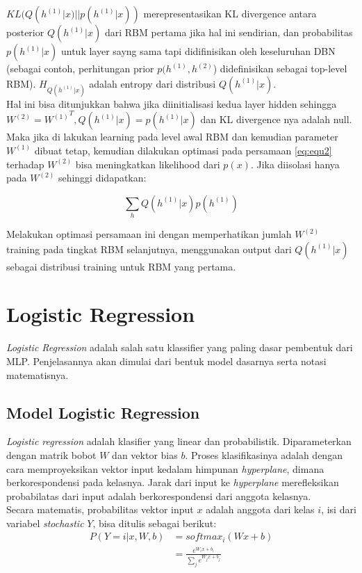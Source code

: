 $KL(Q(h^{(1)}|x) || p(h^{(1)}|x))$ merepresentasikan KL divergence antara posterior $Q(h^{(1)}|x)$ dari RBM pertama jika hal ini sendirian, dan probabilitas $p(h^{(1)}|x)$ untuk layer sayng sama tapi didifinisikan oleh keseluruhan DBN (sebagai contoh, perhitungan prior $p(h^{(1)},h^{(2)}$) didefinisikan sebagai top-level RBM). $H_{Q(h^{(1)}|x)}$ adalah entropy dari distribusi $Q(h^{(1)}|x)$.\\
Hal ini bisa ditunjukkan bahwa jika diinitialisasi kedua layer hidden sehingga $W^{(2)}={W^{(1)}}^T, Q(h^{(1)}|x)=p(h^{(1)}|x)$ dan KL divergence nya adalah null. Maka jika di lakukan learning pada level awal RBM dan kemudian parameter $ W^{(1)}$ dibuat tetap, kemudian dilakukan optimasi pada persamaan \ref{eq:equ2} terhadap $W^{(2)}$ bisa meningkatkan likelihood dari $p(x)$.
Jika diisolasi hanya pada $W^{(2)}$ sehinggi didapatkan:

\[\sum_h Q(h^{(1)}|x)p(h^{(1)})\]

Melakukan optimasi persamaan ini dengan memperhatikan jumlah $W^{(2)}$ training pada tingkat RBM selanjutnya, menggunakan output dari $Q(h^{(1)}|x)$ sebagai distribusi training untuk RBM yang pertama.

\section{Logistic Regression}
\textit{Logistic Regression} adalah salah satu klassifier yang paling dasar pembentuk dari MLP. Penjelasannya akan dimulai dari bentuk model dasarnya serta notasi matematisnya.

\subsection{Model Logistic Regression}
\textit{Logistic regression} adalah klasifier yang linear dan probabilistik. Diparameterkan dengan matrik bobot $W$ dan vektor bias $b$. Proses klasifikasinya adalah dengan cara memproyeksikan vektor input kedalam himpunan \textit{hyperplane}, dimana berkorespondensi pada kelasnya. Jarak dari input ke \textit{hyperplane} merefleksikan probabilatas dari input adalah berkorespondensi dari anggota kelasnya.\\
Secara matematis, probabilitas vektor input $x$ adalah anggota dari kelas $i$, isi dari variabel \textit{stochastic} $Y$, bisa ditulis sebagai berikut:
\begin{equation}
\begin{aligned}
P(Y=i|x, W,b) &= softmax_i(W x + b) \\
              &= \frac {e^{W_i x + b_i}} {\sum_j e^{W_j x + b_j}}
\end{aligned}
\end{equation}

